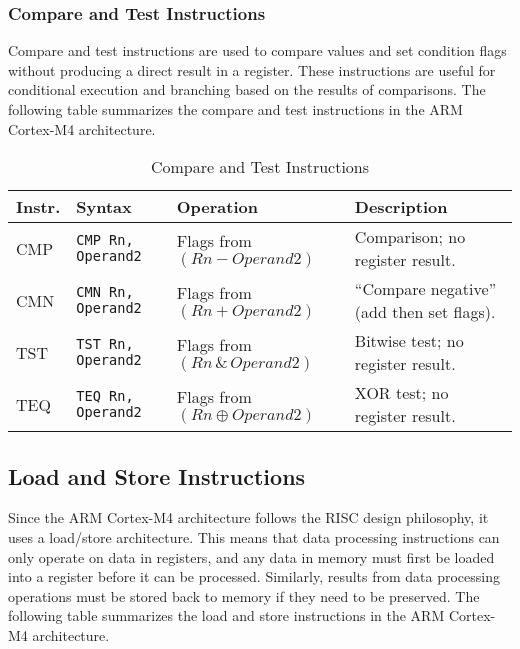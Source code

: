 \subsubsection{Compare and Test Instructions}
Compare and test instructions are used to compare values and set condition flags without producing a direct result in a register. These instructions are useful for conditional execution and branching based on the results of comparisons. The following table summarizes the compare and test instructions in the ARM Cortex-M4 architecture.
\begin{table}[H]
\centering
\caption{Compare and Test Instructions}
\small
\begin{tabularx}{\linewidth}{@{}l l l X@{}}
\toprule
\textbf{Instr.} & \textbf{Syntax} & \textbf{Operation} & \textbf{Description} \\
\midrule
CMP & \texttt{CMP Rn, Operand2} & Flags from $(Rn - Operand2)$ & Comparison; no register result. \\
CMN & \texttt{CMN Rn, Operand2} & Flags from $(Rn + Operand2)$ & “Compare negative” (add then set flags). \\
TST & \texttt{TST Rn, Operand2} & Flags from $(Rn \,\&\, Operand2)$ & Bitwise test; no register result. \\
TEQ & \texttt{TEQ Rn, Operand2} & Flags from $(Rn \oplus Operand2)$ & XOR test; no register result. \\
\bottomrule
\end{tabularx}
\end{table}

\subsection{Load and Store Instructions}
Since the ARM Cortex-M4 architecture follows the RISC design philosophy, it uses a load/store architecture. This means that data processing instructions can only operate on data in registers, and any data in memory must first be loaded into a register before it can be processed. Similarly, results from data processing operations must be stored back to memory if they need to be preserved. The following table summarizes the load and store instructions in the ARM Cortex-M4 architecture.

